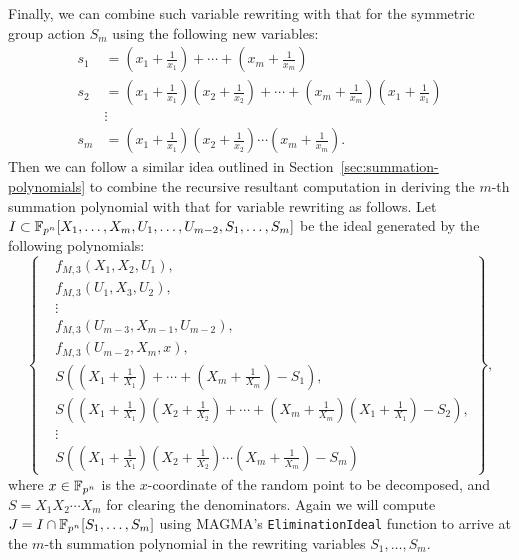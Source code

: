 Finally, we can combine such variable rewriting with that for the
symmetric group action $S_m$ using the following new variables:
%
\begin{align*}
  s_1 & = (x_1+\frac{1}{x_1})+\cdots+(x_m+\frac{1}{x_m}) \\
  s_2 & = (x_1+\frac{1}{x_1})(x_2+\frac{1}{x_2})+\cdots+(x_m+\frac{1}{x_m})(x_1+\frac{1}{x_1}) \\
      &\vdots \\
  s_m & = (x_1+\frac{1}{x_1})(x_2+\frac{1}{x_2})\cdots(x_m+\frac{1}{x_m}).
\end{align*}
%
Then we can follow a similar idea outlined in
Section~\ref{sec:summation-polynomials} to combine the recursive
resultant computation in deriving the $m$-th summation polynomial with
that for variable rewriting as follows.
%
Let
$I\subset\mathbb F_{p^n}[X_1,\ldots,X_m,U_1,\ldots,U_{m-2},S_1,\ldots,S_m]$ be
the ideal generated by the following polynomials:
%
\[ \left\{\begin{aligned}
      & f_{M,3}(X_1,X_2,U_1), \\
      & f_{M,3}(U_1,X_3,U_2), \\
      & \vdots \\
      & f_{M,3}(U_{m-3},X_{m-1},U_{m-2}), \\
      & f_{M,3}(U_{m-2},X_m,x), \\
      & S\left((X_1+\frac{1}{X_1})+\cdots+(X_m+\frac{1}{X_m}) -
        S_1\right), \\
      &
      S\left((X_1+\frac{1}{X_1})(X_2+\frac{1}{X_2})+\cdots+(X_m+\frac{1}{X_m})(X_1+\frac{1}{X_1})
        - S_2\right), \\
      & \vdots \\
      &
      S\left((X_1+\frac{1}{X_1})(X_2+\frac{1}{X_2})\cdots(X_m+\frac{1}{X_m})
        - S_m\right)
\end{aligned}\right\}, \]
where $x\in\mathbb F_{p^n}$ is the $x$-coordinate of the random point to be
decomposed, and $S=X_1X_2\cdots X_m$ for clearing the denominators.
%
Again we will compute $J=I\cap\mathbb F_{p^n}[S_1,\ldots,S_m]$ using MAGMA's
\texttt{EliminationIdeal} function to arrive at the $m$-th summation
polynomial in the rewriting variables $S_1,\ldots,S_m$.
